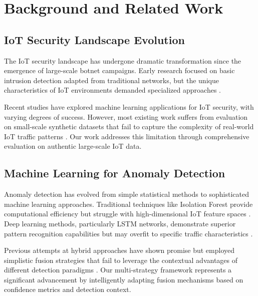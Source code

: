 \documentclass[conference]{IEEEtran}
\begin{document}
\section{Background and Related Work}

\subsection{IoT Security Landscape Evolution}

The IoT security landscape has undergone dramatic transformation since the emergence of large-scale botnet campaigns. Early research focused on basic intrusion detection adapted from traditional networks, but the unique characteristics of IoT environments demanded specialized approaches \cite{early_iot_security_2018}.

Recent studies have explored machine learning applications for IoT security, with varying degrees of success. However, most existing work suffers from evaluation on small-scale synthetic datasets that fail to capture the complexity of real-world IoT traffic patterns \cite{iot_ml_review_2023}. Our work addresses this limitation through comprehensive evaluation on authentic large-scale IoT data.

\subsection{Machine Learning for Anomaly Detection}

Anomaly detection has evolved from simple statistical methods to sophisticated machine learning approaches. Traditional techniques like Isolation Forest provide computational efficiency but struggle with high-dimensional IoT feature spaces \cite{isolation_forest_2008}. Deep learning methods, particularly LSTM networks, demonstrate superior pattern recognition capabilities but may overfit to specific traffic characteristics \cite{lstm_anomaly_2020}.

Previous attempts at hybrid approaches have shown promise but employed simplistic fusion strategies that fail to leverage the contextual advantages of different detection paradigms \cite{hybrid_detection_2021}. Our multi-strategy framework represents a significant advancement by intelligently adapting fusion mechanisms based on confidence metrics and detection context.
\end{document}
